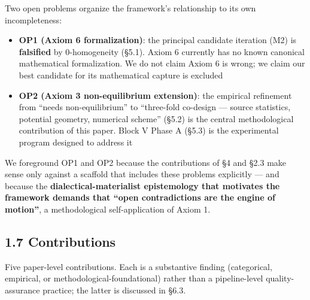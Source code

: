 \documentclass[
]{article}
\providecommand{\tightlist}{%
  \setlength{\itemsep}{0pt}\setlength{\parskip}{0pt}}
\begin{document}
Two open problems organize the framework's relationship to its own
incompleteness:

\begin{itemize}
\tightlist
\item
  \textbf{OP1 (Axiom 6 formalization)}: the principal candidate
  iteration (M2) is \textbf{falsified} by 0-homogeneity (§5.1). Axiom 6
  currently has no known canonical mathematical formalization. We do not
  claim Axiom 6 is wrong; we claim our best candidate for its
  mathematical capture is excluded
\item
  \textbf{OP2 (Axiom 3 non-equilibrium extension)}: the empirical
  refinement from ``needs non-equilibrium'' to ``three-fold co-design
  --- source statistics, potential geometry, numerical scheme'' (§5.2)
  is the central methodological contribution of this paper. Block V
  Phase A (§5.3) is the experimental program designed to address it
\end{itemize}

We foreground OP1 and OP2 because the contributions of §4 and §2.3 make
sense only against a scaffold that includes these problems explicitly
--- and because the \textbf{dialectical-materialist epistemology that
motivates the framework demands that ``open contradictions are the
engine of motion''}, a methodological self-application of Axiom 1.

\hypertarget{contributions}{%
\subsection{1.7 Contributions}\label{contributions}}

Five paper-level contributions. Each is a substantive finding
(categorical, empirical, or methodological-foundational) rather than a
pipeline-level quality-assurance practice; the latter is discussed in
§6.3.
\end{document}
